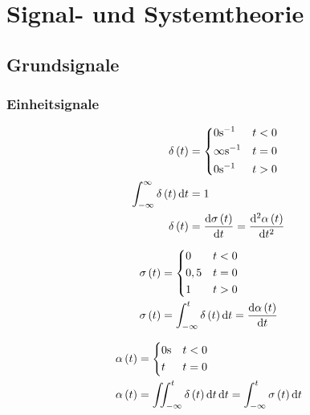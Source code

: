 \chapter{Signal- und Systemtheorie}

\section{Grundsignale}

\subsection{Einheitsignale}
\begin{boxleft}
\end{boxleft}\begin{boxrightshaded}
\begin{align*}
\delta\left(t\right)&=
\begin{dcases*}
  0\si{\per\second}&$t<0$\\
\infty\si{\per\second}& $t=0$\\
  0\si{\per\second}&$t>0$
\end{dcases*}\\
\int_{-\infty}^\infty\delta\left(t\right)\diff t&=1\\
\delta\left(t\right)&=\frac{\diff \sigma\left(t\right)}{\diff t}=\frac{\diff^2 \alpha\left(t\right)}{\diff t^2}
\end{align*}
\end{boxrightshaded}


\begin{boxleft}
\end{boxleft}\begin{boxrightshaded}
\begin{align*}
\sigma\left(t\right)&=
\begin{dcases*}
  0&$t<0$\\
0,5& $t=0$\\
  1&$t>0$
\end{dcases*}\\
\sigma\left(t\right)&=\int_{-\infty}^t \delta\left(t\right)\diff t=\frac{\diff \alpha\left(t\right)}{\diff t}
\end{align*}
\end{boxrightshaded}


\begin{boxleft}
\end{boxleft}\begin{boxrightshaded}
\begin{align*}
\alpha\left(t\right)&=
\begin{dcases*}
  0\si{\second}&$t<0$\\
t& $t=0$
\end{dcases*}\\
\alpha\left(t\right)&=\iint_{-\infty}^t \delta\left(t\right)\diff t\diff t=\int_{-\infty}^t \sigma\left(t\right)\diff t
\end{align*}
\end{boxrightshaded}


